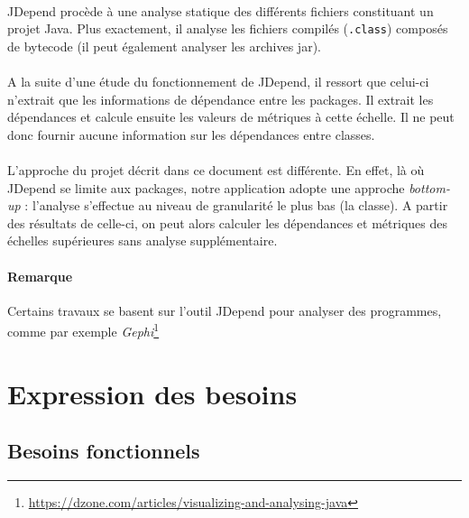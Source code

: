 \documentclass{scrartcl}
\begin{document}
    \paragraph{}JDepend procède à une analyse statique des différents fichiers constituant un projet Java. Plus exactement, il analyse les fichiers compilés (\texttt{.class}) composés de bytecode (il peut également analyser les archives jar).
    
    \paragraph{}A la suite d'une étude du fonctionnement de JDepend, il ressort que celui-ci n'extrait que les informations de dépendance entre les packages. Il extrait les dépendances et calcule ensuite les valeurs de métriques à cette échelle. Il ne peut donc fournir aucune information sur les dépendances entre classes. 
    
    \paragraph{}L'approche du projet décrit dans ce document est différente. En effet, là où JDepend se limite aux packages, notre application adopte une approche \textit{bottom-up} : l'analyse s'effectue au niveau de granularité le plus bas (la classe). A partir des résultats de celle-ci, on peut alors calculer les dépendances et métriques des échelles supérieures sans analyse supplémentaire.
    
    \paragraph{Remarque}Certains travaux se basent sur l'outil JDepend pour analyser des programmes, comme par exemple \textit{Gephi}\footnote{\url{https://dzone.com/articles/visualizing-and-analysing-java}}







\newpage
\section{Expression des besoins}

\subsection{Besoins fonctionnels}
\end{document}
